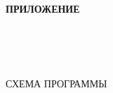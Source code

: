 \begin{ESKDtitlePage}
  \begin{flushright}
    \textbf{ПРИЛОЖЕНИЕ~\envPracticePrilLetter} \enspace\enspace
  \end{flushright}

  \begin{center}
    \envPracticeEducation\\
    \envPracticeUniversity\\
    \envPracticeFaculty\\
    \envPracticeCathedra
  \end{center}

  \vfill

  \begin{center}
    СХЕМА ПРОГРАММЫ
  \end{center}

  \vfill

  

  \vfill

  \begin{center}
    \envPracticeCity~\ESKDtheYear
  \end{center}
\end{ESKDtitlePage}
